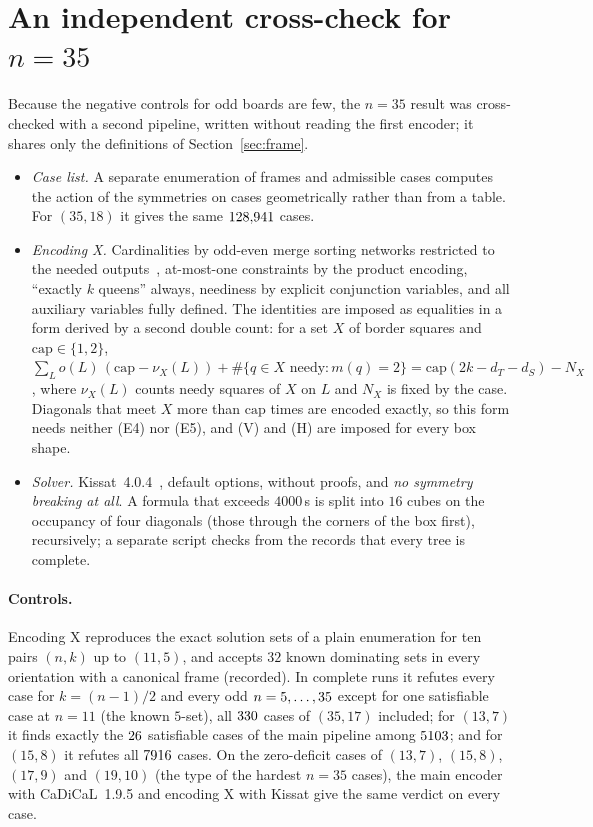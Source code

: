 \documentclass[11pt]{article}
\theoremstyle{definition}
\theoremstyle{remark}
\newcommand{\dT}{d_T}
\newcommand{\dS}{d_S}
\begin{document}
\section{An independent cross-check for \texorpdfstring{$n=35$}{n=35}}\label{sec:xcheck}

Because the negative controls for odd boards are few, the $n=35$ result was cross-checked with a second
pipeline, written without reading the first encoder; it shares only the definitions of
Section~\ref{sec:frame}.
\begin{itemize}
\item \emph{Case list.} A separate enumeration of frames and admissible cases computes the action of the
symmetries on cases geometrically rather than from a table. For $(35,18)$ it gives the same
$128{,}941$ cases.
\item \emph{Encoding X.} Cardinalities by odd-even merge sorting networks restricted to the needed
outputs~\cite{Batcher}, at-most-one constraints by the product encoding, ``exactly $k$ queens'' always,
neediness by explicit conjunction variables, and all auxiliary variables fully defined. The identities
are imposed as equalities in a form derived by a second double count: for a set $X$ of border squares and
$\mathrm{cap}\in\{1,2\}$,
$\sum_L o(L)\,(\mathrm{cap}-\nu_X(L))+\#\{q\in X\text{ needy}:m(q)=2\}=\mathrm{cap}(2k-\dT-\dS)-N_X$, where
$\nu_X(L)$ counts needy squares of $X$ on $L$ and $N_X$ is fixed by the case. Diagonals that meet $X$ more
than $\mathrm{cap}$ times are encoded exactly, so this form needs neither (E4) nor (E5), and (V) and (H)
are imposed for every box shape.
\item \emph{Solver.} Kissat~4.0.4~\cite{Kissat}, default options, without proofs, and \emph{no symmetry
breaking at all}. A formula that exceeds $4000$\,s is split into $16$ cubes on the occupancy of four
diagonals (those through the corners of the box first), recursively; a separate script checks from the
records that every tree is complete.
\end{itemize}

\paragraph{Controls.} Encoding X reproduces the exact solution sets of a plain enumeration for ten pairs
$(n,k)$ up to $(11,5)$, and accepts $32$ known dominating sets in every orientation with a canonical frame
(recorded). In complete runs it refutes every case for $k=(n-1)/2$ and every odd $n=5,\dots,35$
except for one satisfiable case at $n=11$ (the known $5$-set), all $330$ cases of $(35,17)$
included; for $(13,7)$ it finds exactly the $26$ satisfiable cases of the main pipeline
among $5103$; and for $(15,8)$ it refutes all $7916$ cases. On the zero-deficit
cases of $(13,7)$, $(15,8)$, $(17,9)$ and $(19,10)$ (the type of the hardest $n=35$ cases), the main
encoder with CaDiCaL~1.9.5 and encoding X with Kissat give the same verdict on every case.
\end{document}
